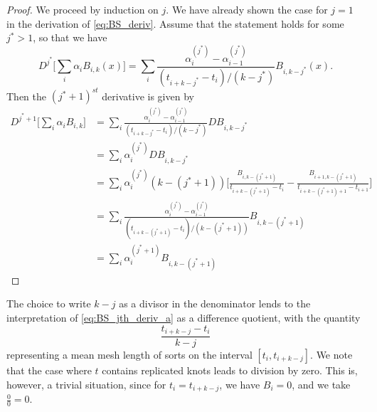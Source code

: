 \documentclass[12pt]{article}
\theoremstyle{definition}
\begin{document}
\begin{enumerate}
\begin{description}
\begin{proof} We proceed by induction on $j$. We have already shown the case for $j=1$ in the derivation of \ref{eq:BS_deriv}. Assume that the statement holds for some $j^* >1$, so that we have
\[
D^{j^*} \bigg[ \sum_i \alpha_i B_{i,k}\left(x\right) \bigg] = \sum_i \frac{\alpha_i^{\left(j^*\right)} - \alpha_{i-1}^{\left(j^*\right)} }{\left( t_{i+k-{j^*}}-t_{i}\right)/\left(k-{j^*}\right)} B_{i,k-j^*}\left(x\right).
\]
Then the $\left( j^* + 1 \right)^{st}$ derivative is given by 
\begin{align*}
D^{j^*+1} \bigg[ \sum_i \alpha_i B_{i,k} \bigg] &= \sum_i \frac{\alpha_i^{\left(j^*\right)} - \alpha_{i-1}^{\left(j^*\right)} }{\left( t_{i+k-{j^*}}-t_{i}\right)/\left(k-{j^*}\right)} D B_{i,k-j^*} \\
&= \sum_i \alpha_i^{\left(j^*\right)} D B_{i,k-j^*} \\
&= \sum_i \alpha_i^{\left(j^*\right)} \left(k-\left(j^*+1\right)\right)\bigg[ \frac{B_{i,k-\left(j^*+1\right)}}{t_{i+k-\left({j^*}+1\right)}-t_{i}} - \frac{ B_{i+1,k-\left(j^*+1\right)} }{ t_{i+k-\left({j^*}+1\right)+1}-t_{i+1}} \bigg] \\
&= \sum_i \frac{\alpha_i^{\left(j^*\right)} - \alpha_{i-1}^{\left(j^*\right)}}{\left(t_{i+k-\left(j^* + 1\right)}-t_i\right)/\left(k-\left(j^*+1\right)\right)}B_{i,k-\left(j^* + 1\right)}\\
&= \sum_i \alpha_i^{\left(j^*+1\right)}  B_{i,k-\left(j^* + 1\right)}
\end{align*}
\end{proof}
The choice to write $k-j$ as a divisor in the denominator lends to the interpretation of \ref{eq:BS_jth_deriv_a} as a difference quotient, with the quantity
\[
\frac{t_{i+k-j} - t_i}{k-j}
\]
representing a mean mesh length of sorts on the interval $\left[t_i,t_{i+k-j}\right]$. We note that the case where $t$ contains replicated knots leads to division by zero. This is, however, a trivial situation, since for $t_i = t_{i+k-j}$, we have $B_i = 0$, and we take $\frac{0}{0} = 0$.
\end{description}


\end{enumerate}
\end{document}
